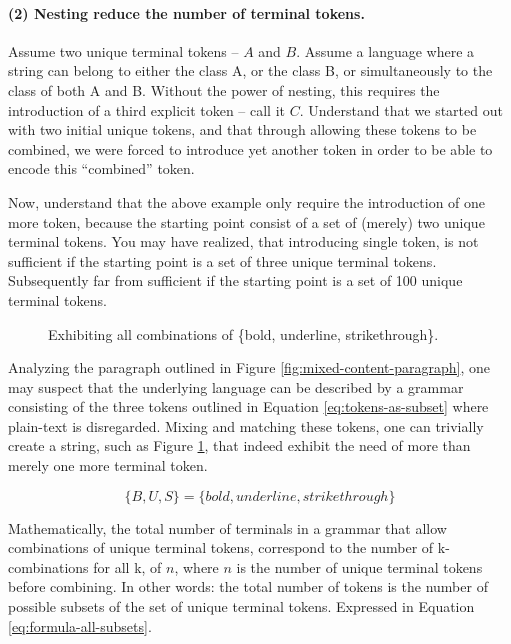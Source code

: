 \documentclass{scrreprt}
\begin{document}
\paragraph{(2) Nesting reduce the number of terminal tokens.}

Assume two unique terminal tokens -- \(A\) and \(B\). Assume a language where a string can belong to either the class A, or the class B, or simultaneously to the class of both A and B. Without the power of nesting, this requires the introduction of a third explicit token -- call it \(C\). Understand that we started out with two initial unique tokens, and that through allowing these tokens to be combined, we were forced to introduce yet another token in order to be able to encode this ``combined'' token.

Now, understand that the above example only require the introduction of one more token, because the starting point consist of a set of (merely) two unique terminal tokens. You may have realized, that introducing single token, is not sufficient if the starting point is a set of three unique terminal tokens. Subsequently far from sufficient if the starting point is a set of 100 unique terminal tokens.


\begin{figure}[h]
\centering
{}
\caption{Exhibiting all combinations of \{bold, underline, strikethrough\}.}
\label{fig:mixed-content-paragraph-complex}
\end{figure}


Analyzing the paragraph outlined in Figure \ref{fig:mixed-content-paragraph}, one may suspect that the underlying language can be described by a grammar consisting of the three tokens outlined in Equation \ref{eq:tokens-as-subset} where plain-text is disregarded. Mixing and matching these tokens, one can trivially create a string, such as Figure \ref{fig:mixed-content-paragraph-complex}, that indeed exhibit the need of more than merely one more terminal token.



\begin{equation}
\{B, U, S\} = \{bold, underline, strikethrough\}
\label{eq:tokens-as-subset}
\end{equation}



Mathematically, the total number of terminals in a grammar that allow combinations of unique terminal tokens, correspond to the number of k-combinations for all k, of \(n\), where \(n\) is the number of unique terminal tokens before combining. In other words: the total number of tokens is the number of possible subsets of the set of unique terminal tokens. Expressed in Equation \ref{eq:formula-all-subsets}.
\end{document}
